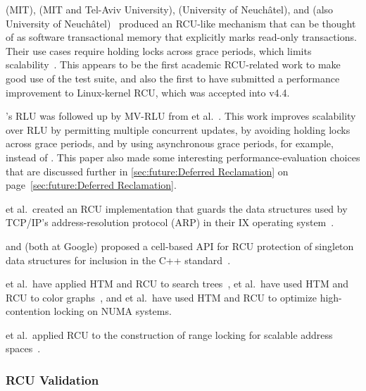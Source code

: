  (MIT),  (MIT and Tel-Aviv University),
 (University of Neuch\^{a}tel), and  (also
University of Neuch\^{a}tel)~\cite{Matveev:2015:RLS:2815400.2815406}
produced an RCU-like mechanism that can be thought of as
software transactional memory that explicitly marks
read-only transactions.
Their use cases require holding locks across grace periods, which limits
scalability~\cite{PaulEMcKenney2015ReadMostly,PaulEMcKenney2015ReadMostlySidebar}.
This appears to be the first academic RCU-related work to
make good use of the  test suite, and also the
first to have submitted a performance improvement to Linux-kernel
RCU, which was accepted into v4.4.

's RLU was followed up by MV-RLU from
 et al.~\cite{Kim:2019:MSR:3297858.3304040}.
This work improves scalability over RLU by permitting multiple concurrent
updates, by avoiding holding locks across grace periods, and by using
asynchronous grace periods, for example,  instead of
.
This paper also made some interesting performance-evaluation choices that
are discussed further in
\cref{sec:future:Deferred Reclamation}
on
page~\ref{sec:future:Deferred Reclamation}.

 et al.~created an RCU implementation that guards the
data structures used by TCP/IP's address-resolution protocol (ARP)
in their IX operating system~\cite{Belay:2016:IOS:3014162.2997641}.

 and  (both at Google) proposed
a cell-based API for RCU
protection of singleton data structures for inclusion in the
C++ standard~\cite{GeoffRomer2018C++DeferredReclamationP0561R4}.

 et al.~have applied
HTM and RCU to search trees~\cite{Siakavaras2017CombiningHA,DimitriosSiakavaras2020RCU-HTM-B+Trees},
 et al.~have used HTM and RCU to color
graphs~\cite{ChristinaGiannoula2018HTM-RCU-graphcoloring},
and
 et al.~have used HTM and RCU to optimize high-contention
locking on NUMA systems.

 et al.~applied RCU to the construction of range locking
for scalable address spaces~\cite{AlexKogan2020RCUrangelocks}.

\subsubsection{RCU Validation}
\label{sec:defer:RCU Validation}

